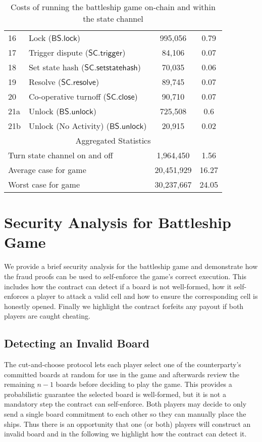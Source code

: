 \documentclass{llncs}
\newcommand{\statechanneldispute}{\mathsf{SC}.\mathsf{trigger}}
\newcommand{\statechannelsetstate}{\mathsf{SC}.\mathsf{setstatehash}}
\newcommand{\statechannelresolve}{\mathsf{SC}.\mathsf{resolve}}
\newcommand{\statechannelclose}{\mathsf{SC}.\mathsf{close}}
\newcommand{\battleshiplock}{\mathsf{BS.lock}}
\newcommand{\battleshipunlock}{\mathsf{BS.unlock}}
\begin{document}
\begin{table}
\begin{tabular}[]{l l c c}
		16 & Lock ($\battleshiplock$) & 995,056 & 0.79 \\
		17 & Trigger dispute ($\statechanneldispute$) & 84,106 & 0.07\\
		18 & Set state hash ($\statechannelsetstate$) & 70,035 & 0.06 \\
		19 & Resolve ($\statechannelresolve$) &89,745 & 0.07 \\
		20 & Co-operative turnoff ($\statechannelclose$) & 90,710 & 0.07 \\
		21a & Unlock ($\battleshipunlock$) & 725,508 & 0.6 \\
		21b & Unlock (No Activity) ($\battleshipunlock$) & 20,915 & 0.02 \\
		\hline
		\multicolumn{4}{c}{Aggregated Statistics} \\
		\hline
		\multicolumn{2}{l}{Turn state channel on and off} & 1,964,450  & 1.56 \\
		\multicolumn{2}{l}{Average case for game} & 20,451,929 & 16.27 \\
		\multicolumn{2}{l}{Worst case for game} & 30,237,667 & 24.05 \\
		\hline 
	\end{tabular}
	
	\caption{Costs of running the battleship game on-chain and within the state channel}\label{tab:costs}
\end{table}



\section{Security Analysis for Battleship Game} \label{sec:secanalysis}

We provide a brief security analysis for the battleship game and demonstrate how the fraud proofs can be used to self-enforce the game's correct execution.
This includes how the contract can detect if a board is not well-formed, how it self-enforces a player to attack a valid cell and how to ensure the corresponding cell is honestly opened. 
Finally we highlight the contract forfeits any payout if both players are caught cheating. 

\subsection{Detecting an Invalid Board}

The cut-and-choose protocol lets each player select one of the counterparty's committed boards at random for use in the game and afterwards review the remaining $n-1$ boards before deciding to play the game. 
This provides a probabilistic guarantee the selected board is well-formed, but it is not a mandatory step the contract can self-enforce. 
Both players may decide to only send a single board commitment to each other so they can manually place the ships. 
Thus there is an opportunity that one (or both) players will construct an invalid board and in the following we highlight how the contract can detect it.  
\end{document}
